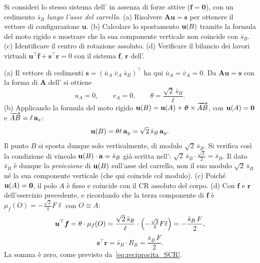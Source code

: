 \begin{esercizio}
	\label{ex:C05_trave_inclinata_cin}
	
	Si consideri lo stesso sistema dell'
	in assenza di forze attive ($\bm{f}=\bm{0}$), con un cedimento
	$\bar{s}_B$ \emph{lungo l'asse del carrello}.
	(a) Risolvere $\bm{A}\bm{u}=\bm{s}$ per ottenere il vettore di
	configurazione $\bm{u}$. (b) Calcolare lo spostamento $\mathbf{u}(B)$
	tramite la formula del moto rigido e mostrare che la sua
	componente verticale non coincide con $\bar{s}_B$.
	(c) Identificare il centro di rotazione assoluto.
	(d) Verificare il bilancio dei lavori virtuali
	$\bm{u}^\top\bm{f}+\bm{s}^\top\bm{r}=0$ con il sistema
	$\bm{f}$, $\bm{r}$ dell'.
	
	\risultato (a) Il vettore di cedimenti
	$\bm{s}=(\bar{u}_A\;\bar{v}_A\;\bar{s}_B)^\top$ ha qui
	$\bar{u}_A=\bar{v}_A=0$. Da $\bm{A}\bm{u}=\bm{s}$ con la forma di
	$\bm{A}$ dell' si ottiene
	\[
	u_A=0,\qquad v_A=0,\qquad
	\theta=\frac{\sqrt{2}\,\bar{s}_B}{\ell}.
	\]
	(b) Applicando la formula del moto rigido
	$\mathbf{u}(B)=\mathbf{u}(A)+\bm{\upvartheta}\times\overrightarrow{AB}$, con
	$\mathbf{u}(A)=\bm{0}$ e $\overrightarrow{AB}=\ell\,\mathbf{a}_x$:
	\[
	\mathbf{u}(B)=\theta\ell\,\mathbf{a}_y=\sqrt{2}\,\bar{s}_B\,\mathbf{a}_y.
	\]
	Il punto $B$ si sposta dunque solo verticalmente, di modulo
	$\sqrt{2}\,\bar{s}_B$. Si verifica così la condizione di
	vincolo $\mathbf{u}(B)\cdot\mathbf{a}=\bar{s}_B$ già scritta
	nell':
	$\sqrt{2}\,\bar{s}_B\cdot\tfrac{\sqrt{2}}{2}=\bar{s}_B$. Il dato
	$\bar{s}_B$ è dunque la \emph{proiezione} di $\mathbf{u}(B)$ sull'asse
	del carrello, non il suo modulo $\sqrt{2}\,\bar{s}_B$ né la sua
	componente verticale (che qui coincide col modulo).
	(c) Poiché $\mathbf{u}(A)=\bm{0}$, il polo $A$ è fisso e coincide con
	il CR assoluto del corpo.
	(d) Con $\bm{f}$ e $\bm{r}$ dell'esercizio precedente, e
	ricordando che la terza componente di $\bm{f}$ è
	$\mu_f(O)=-\tfrac{\sqrt{2}}{4}F\ell$ con $O\equiv A$:
	\[
	\bm{u}^\top\bm{f}
	= \theta\cdot\mu_f(O)
	= \frac{\sqrt{2}\,\bar{s}_B}{\ell}\cdot
	\Bigl(-\tfrac{\sqrt{2}}{4}F\ell\Bigr)
	= -\frac{\bar{s}_B\,F}{2},
	\]
	\[
	\bm{s}^\top\bm{r} = \bar{s}_B\cdot R_B = \frac{\bar{s}_B\,F}{2}.
	\]
	La somma è zero, come previsto da~\eqref{eq:reciprocita_SCR}.
\end{esercizio}






